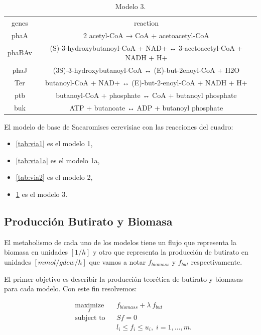 \documentclass[12pt,spanish]{article}
\begin{document}
\begin{table}[ht]
\begin{tabular}{cc}
genes & reaction \\
phaA & 2 acetyl-CoA → CoA + acetoacetyl-CoA \\
phaBAv & (S)-3-hydroxybutanoyl-CoA + NAD+ ↔ 3-acetoacetyl-CoA + NADH + H+ \\
phaJ & (3S)-3-hydroxybutanoyl-CoA ↔ (E)-but-2enoyl-CoA + H2O \\
Ter & butanoyl-CoA + NAD+ ↔ (E)-but-2-enoyl-CoA + NADH + H+ \\
ptb & butanoyl-CoA + phosphate ↔  CoA + butanoyl phosphate \\
buk & ATP + butanoate ↔  ADP + butanoyl phosphate
\end{tabular}
\caption{Modelo 3.}\label{tab:via3}
\end{table}



El modelo de base de Sacaromises cerevisiae con las reacciones del cuadro:

\begin{itemize}
  \item \ref{tab:via1} es el modelo 1,
  \item \ref{tab:via1a} es el modelo 1a,
  \item \ref{tab:via2} es el modelo 2,
  \item \ref{tab:via3} es el modelo 3.
\end{itemize}

\subsection{Producción Butirato y Biomasa}

El metabolismo de cada uno de los modelos tiene un flujo que representa la biomasa en unidades $[1/h]$ y otro que representa la producción de butirato en unidades $[mmol/gdcw/h]$ que vamos a notar $f_{biomass}$ y $f_{but}$ respectivamente.

\par
El primer objetivo es describir la producción teorética de butirato y biomasas para cada modelo. Con este fin resolvemos:


\begin{equation*}\label{eq:prob1}
\begin{aligned}
& \underset{f}{\text{maximize}}
& &  f_{biomass} +  \lambda \ f_{but} \\
& \text{subject to}
& & Sf = 0 \\
&&& l_i \leq f_i \leq u_i, \; i = 1, \ldots, m.
\end{aligned}
\end{equation*}
\end{document}
